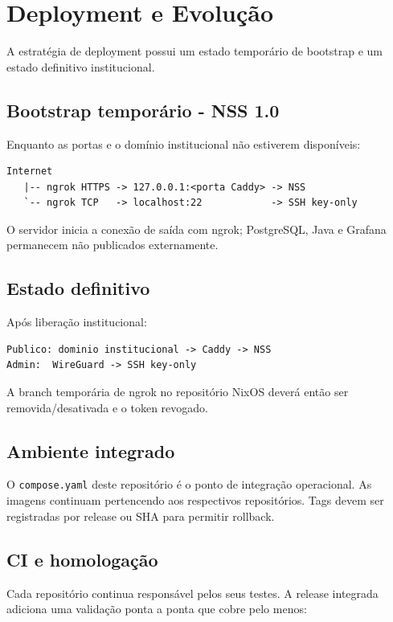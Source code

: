 \section{Deployment e Evolução}

A estratégia de deployment possui um estado temporário de bootstrap e um estado definitivo institucional.

\subsection{Bootstrap temporário - NSS 1.0}

Enquanto as portas e o domínio institucional não estiverem disponíveis:

\begin{lstlisting}
Internet
   |-- ngrok HTTPS -> 127.0.0.1:<porta Caddy> -> NSS
   `-- ngrok TCP   -> localhost:22            -> SSH key-only
\end{lstlisting}

O servidor inicia a conexão de saída com ngrok; PostgreSQL, Java e Grafana permanecem não publicados externamente.

\subsection{Estado definitivo}

Após liberação institucional:

\begin{lstlisting}
Publico: dominio institucional -> Caddy -> NSS
Admin:  WireGuard -> SSH key-only
\end{lstlisting}

A branch temporária de ngrok no repositório NixOS deverá então ser removida/desativada e o token revogado.

\subsection{Ambiente integrado}

O \texttt{compose.yaml} deste repositório é o ponto de integração operacional. As imagens continuam pertencendo aos respectivos repositórios. Tags devem ser registradas por release ou SHA para permitir rollback.

\subsection{CI e homologação}

Cada repositório continua responsável pelos seus testes. A release integrada adiciona uma validação ponta a ponta que cobre pelo menos:

